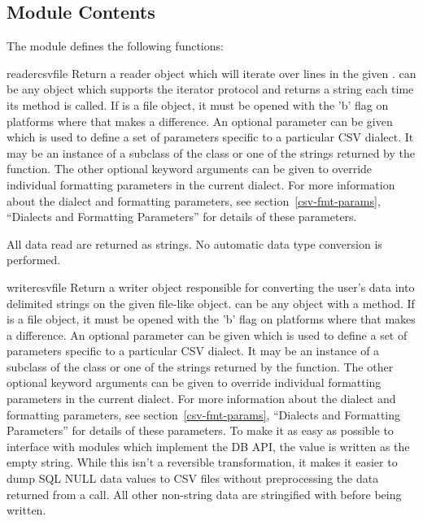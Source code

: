 \subsection{Module Contents \label{csv-contents}}

The  module defines the following functions:

\begin{funcdesc}{reader}{csvfile}
Return a reader object which will iterate over lines in the given
{}.   can be any object which supports the
iterator protocol and returns a string each time its 
method is called.  If  is a file object, it must be opened with
the 'b' flag on platforms where that makes a difference.  An optional
{} parameter can be given
which is used to define a set of parameters specific to a particular CSV
dialect.  It may be an instance of a subclass of the 
class or one of the strings returned by the 
function.  The other optional {} keyword arguments can be
given to override individual formatting parameters in the current
dialect.  For more information about the dialect and formatting
parameters, see section~\ref{csv-fmt-params}, ``Dialects and Formatting
Parameters'' for details of these parameters.

All data read are returned as strings.  No automatic data type
conversion is performed.
\end{funcdesc}

\begin{funcdesc}{writer}{csvfile}
Return a writer object responsible for converting the user's data into
delimited strings on the given file-like object.   can be any
object with a  method.  If  is a file object,
it must be opened with the 'b' flag on platforms where that makes a
difference.  An optional
{} parameter can be given which is used to define a set of
parameters specific to a particular CSV dialect.  It may be an instance
of a subclass of the  class or one of the strings
returned by the  function.  The other optional
{} keyword arguments can be given to override individual
formatting parameters in the current dialect.  For more information
about the dialect and formatting parameters, see
section~\ref{csv-fmt-params}, ``Dialects and Formatting Parameters'' for
details of these parameters.  To make it as easy as possible to
interface with modules which implement the DB API, the value
 is written as the empty string.  While this isn't a
reversible transformation, it makes it easier to dump SQL NULL data values
to CSV files without preprocessing the data returned from a
 call.  All other non-string data are stringified
with  before being written.
\end{funcdesc}

